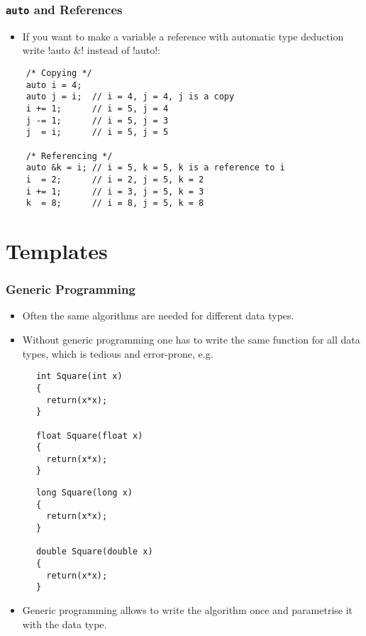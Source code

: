 \begin{frame}[fragile]
  \frametitle<presentation>{\texttt{auto} and References}
  \begin{itemize}
  \item If you want to make a variable a reference with automatic type deduction write \inline!auto &! instead of \inline!auto!:
  \end{itemize}

  \begin{lstlisting}
    /* Copying */
    auto i = 4;
    auto j = i;  // i = 4, j = 4, j is a copy
    i += 1;      // i = 5, j = 4
    j -= 1;      // i = 5, j = 3
    j  = i;      // i = 5, j = 5

    /* Referencing */
    auto &k = i; // i = 5, k = 5, k is a reference to i
    i  = 2;      // i = 2, j = 5, k = 2
    i += 1;      // i = 3, j = 5, k = 3
    k  = 8;      // i = 8, j = 5, k = 8
  \end{lstlisting}
\end{frame}


\section{Templates}


\begin{frame}[fragile]
\frametitle<presentation>{Generic Programming}


\begin{itemize}%
\item Often the same algorithms are needed for different data types.
\item Without generic programming one has to write the same function for all data types, which is tedious and error-prone, e.g.
\end{itemize}
\vspace*{-10mm}
\begin{multicols}{2}
    \begin{lstlisting}
      int Square(int x)
      {
        return(x*x);
      }

      float Square(float x)
      {
        return(x*x);
      }
    \end{lstlisting}

    \begin{lstlisting}
      long Square(long x)
      {
        return(x*x);
      }

      double Square(double x)
      {
        return(x*x);
      }      
    \end{lstlisting}
\end{multicols}
\vskip-7mm
\begin{itemize}
\item Generic programming allows to write the algorithm once and parametrise it with the
data type.
\end{itemize}

\end{frame}

